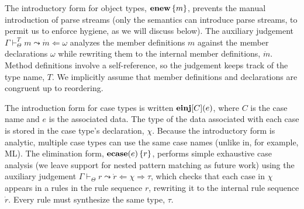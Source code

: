 The introductory form for object types, $\textbf{enew}\,\{m\}$, prevents the manual introduction of parse streams (only the semantics can introduce parse streams, to permit us to enforce hygiene, as we will discuss below). The auxiliary judgement $\Gamma \vdash_\Theta^T m \leadsto \dot{m} \Leftarrow \omega$ analyzes the member definitions $m$ against the member declarations $\omega$ while rewriting them to the internal member definitions, $\dot{m}$. Method definitions involve a self-reference, so the judgement keeps track of the type  name, $T$. We implicitly assume that member definitions and declarations are congruent up to reordering.

The introduction form for case types is written $\textbf{einj}[C](e)$, where $C$ is the case name and $e$ is the associated data. The type of the data associated with each case is stored in the case type's declaration, $\chi$. Because the introductory form is analytic, multiple case types can use the same case names (unlike in, for example, ML). The elimination form, $\textbf{ecase}(e)\,\{r\}$, performs simple exhaustive case analysis (we leave support for nested pattern matching as future work) using the auxiliary judgement $\Gamma \vdash_\Theta r \leadsto \dot{r} \Leftarrow \chi \Rightarrow \tau$, which checks that each case in $\chi$ appears in a rules in the rule sequence $r$, rewriting it to the internal rule sequence $\dot{r}$. Every rule must synthesize the same type, $\tau$.

